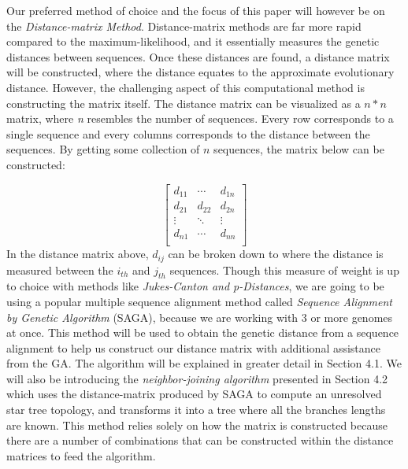 Our preferred method of choice and the focus of this paper will however be on the \emph{Distance-matrix Method}. Distance-matrix methods are far more rapid compared to the maximum-likelihood, and it essentially measures the genetic distances between sequences. Once these distances are found, a distance matrix will be constructed, where the distance equates to the approximate evolutionary distance. However, the challenging aspect of this computational method is constructing the matrix itself. The distance matrix can be visualized as a $n * n$ matrix, where \emph{n} resembles the number of sequences. Every row corresponds to a single sequence and every columns corresponds to the distance between the sequences. By getting some collection of $n$ sequences, the matrix below can be constructed:

\begin{equation}
\label{Distance-matirx}
\begin{bmatrix} 
d_{11} & \cdots & d_{1n} \\
d_{21} & d_{22} & d_{2n}\\
\vdots & \ddots & \vdots\\
d_{n1} & \cdots & d_{nn} \\
\end{bmatrix}
\end{equation}       
In the distance matrix above, $d_{ij}$ can be broken down to where the distance is measured between the $i_{th}$ and $j_{th}$ sequences. Though this measure of weight is up to choice with methods like \emph{Jukes-Canton and p-Distances}, we are going to be using a popular multiple sequence alignment method called \emph{Sequence Alignment by Genetic Algorithm} (SAGA), because we are working with 3 or more genomes at once. This method will be used to obtain the genetic distance from a sequence alignment to help us construct our distance matrix with additional assistance from the GA. The algorithm will be explained in greater detail in Section 4.1. We will also be introducing the \emph{neighbor-joining algorithm} presented in Section 4.2 which uses the distance-matrix produced by SAGA to compute an unresolved star tree topology, and transforms it into a tree where all the branches lengths are known. This method relies solely on how the matrix is constructed because there are a number of combinations that can be constructed within the distance matrices to feed the algorithm.      
 
